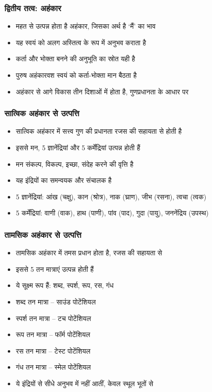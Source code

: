 \begin{frame}[fragile]\frametitle{द्वितीय तत्व: अहंकार}
\begin{itemize}
  \item महत से उत्पन्न होता है अहंकार, जिसका अर्थ है ‘मैं’ का भाव
  \item यह स्वयं को अलग अस्तित्व के रूप में अनुभव कराता है
  \item कर्ता और भोक्ता बनने की अनुभूति का स्रोत यही है
  \item पुरुष अहंकारवश स्वयं को कर्ता-भोक्ता मान बैठता है
  \item अहंकार से आगे विकास तीन दिशाओं में होता है, गुणप्रधानता के आधार पर
\end{itemize}
\end{frame}

\begin{frame}[fragile]\frametitle{सात्विक अहंकार से उत्पत्ति}
\begin{itemize}
  \item सात्विक अहंकार में सत्त्व गुण की प्रधानता रजस की सहायता से होती है
  \item इससे मन, 5 ज्ञानेंद्रियां और 5 कर्मेंद्रियां उत्पन्न होती हैं
  \item मन संकल्प, विकल्प, इच्छा, संदेह करने की वृत्ति है
  \item यह इंद्रियों का समन्वयक और संचालक है
  \item 5 ज्ञानेंद्रियां: आंख (चक्षु), कान (श्रोत्र), नाक (घ्राण), जीभ (रसना), त्वचा (त्वक)
  \item 5 कर्मेंद्रियां: वाणी (वाक), हाथ (पाणी), पांव (पाद), गुदा (पायु), जननेंद्रिय (उपस्थ)
\end{itemize}
\end{frame}

\begin{frame}[fragile]\frametitle{तामसिक अहंकार से उत्पत्ति}
\begin{itemize}
  \item तामसिक अहंकार में तमस प्रधान होता है, रजस की सहायता से
  \item इससे 5 तन मात्राएं उत्पन्न होती हैं
  \item ये सूक्ष्म रूप हैं: शब्द, स्पर्श, रूप, रस, गंध
  \item शब्द तन मात्रा – साउंड पोटेंशियल
  \item स्पर्श तन मात्रा – टच पोटेंशियल
  \item रूप तन मात्रा – फॉर्म पोटेंशियल
  \item रस तन मात्रा – टेस्ट पोटेंशियल
  \item गंध तन मात्रा – स्मेल पोटेंशियल
  \item ये इंद्रियों से सीधे अनुभव में नहीं आतीं, केवल स्थूल भूतों से
\end{itemize}
\end{frame}

